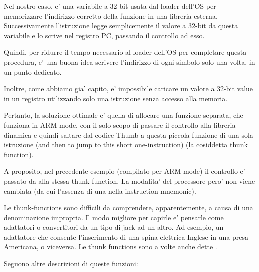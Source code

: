 Nel nostro caso,  e' una variabile a 32-bit usata dal loader dell'\ac{OS} per memorizzare l'indirizzo corretto
della funzione in una libreria esterna. 
Successivamente l'istruzione  legge semplicemente il valore a 32-bit da questa variabile e lo scrive nel registro \ac{PC},
passando il controllo ad esso.

Quindi, per ridurre il tempo necessario al loader dell'\ac{OS} per completare questa procedura, e' una buona idea scrivere l'indirizzo
di ogni simbolo solo una volta, in un punto dedicato.

Inoltre, come abbiamo gia' capito, e' impossibile caricare un valore a 32-bit value in un registro utilizzando solo una istruzione senza
accesso alla memoria.

Pertanto, la soluzione ottimale e' quella di allocare una funzione separata, che funziona in ARM mode, con il solo scopo di passare
il controllo alla libreria dinamica e quindi saltare dal codice Thumb a questa piccola funzione di una sola istruzione (and then to jump to this short one-instruction)
(la cosiddetta \gls{thunk function}).

A proposito, nel precedente esempio (compilato per ARM mode) il controllo e' passato da  alla stessa \gls{thunk function}.
La modalita' del processore pero' non viene cambiata (da cui l'assenza di una  nella instruction mnemonic).


Le thunk-functions sono difficili da comprendere, apparentemente, a causa di una denominazione impropria.
Il modo migliore per capirle e' pensarle come adattatori o convertitori da un tipo di jack ad un altro.
Ad esempio, un adattatore che consente l'inserimento di una spina elettrica Inglese in una presa Americana, o viceversa.
Le thunk functions sono a volte anche dette .

Seguono altre descrizioni di queste funzioni:

